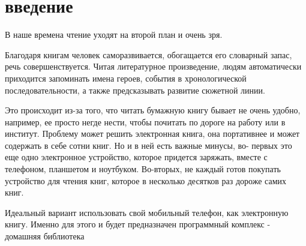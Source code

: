 \chapter*{введение}

В наше времена чтение уходят на второй план и очень зря.\par
Благодаря книгам человек саморазвивается, обогащается его словарный
запас, речь совершенствуется. Читая литературное произведение, людям
автоматически приходится запоминать имена героев, события в
хронологической последовательности, а также предсказывать развитие
сюжетной линии.\par
Это происходит из-за того, что читать бумажную книгу бывает не очень
удобно, например, ее просто негде нести, чтобы почитать по дороге на работу
или в институт. Проблему может решить электронная книга, она портативнее
и может содержать в себе сотни книг. Но и в ней есть важные минусы, во-
первых это еще одно электронное устройство, которое придется заряжать,
вместе с телефоном, планшетом и ноутбуком. Во-вторых, не каждый готов
покупать устройство для чтения книг, которое в несколько десятков раз
дороже самих книг.\par
Идеальный вариант использовать свой мобильный телефон, как
электронную книгу. Именно для этого и будет предназначен программный
комплекс - домашняя библиотека


